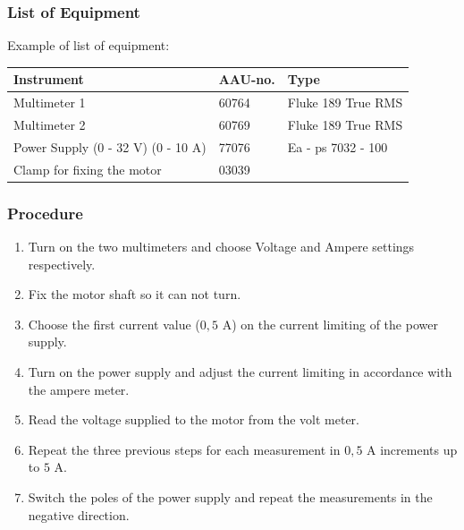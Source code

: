 \subsubsection{List of Equipment}
Example of list of equipment:
\begin{table}[H]
\begin{tabular}{|l|l|p{4cm}|}
\hline%
  \textbf{Instrument}                        &  \textbf{AAU-no.}  &  \textbf{Type}       \\
\hline%
  Multimeter 1                               &  60764             &  Fluke 189 True RMS  \\
\hline%
  Multimeter 2                   		         &  60769             &  Fluke 189 True RMS  \\
\hline%
  Power Supply \small{(0 - 32 V) (0 - 10 A)} &  77076             &  Ea - ps 7032 - 100  \\
\hline%
  Clamp for fixing the motor                 &  03039             &                      \\
\hline%
\end{tabular}
\end{table}

\subsubsection{Procedure}

\begin{enumerate}
  \item Turn on the two multimeters and choose Voltage and Ampere settings respectively.
  \item Fix the motor shaft so it can not turn.
  \item Choose the first current value ($0,5$ A) on the current limiting of the power supply.
  \item Turn on the power supply and adjust the current limiting in accordance with the ampere meter.
  \item Read the voltage supplied to the motor from the volt meter.
  \item Repeat the three previous steps for each measurement in $0,5$ A increments up to $5$ A.
  \item Switch the poles of the power supply and repeat the measurements in the negative direction.
\end{enumerate}

